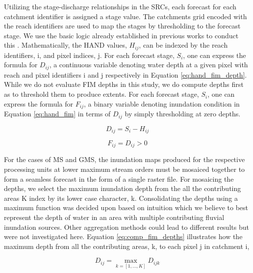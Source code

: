 \documentclass[draft]{dependencies/agujournal2019}
\begin{document}
Utilizing the stage-discharge relationships in the SRCs, each forecast for each catchment identifier is assigned a stage value. 
The catchments grid encoded with the reach identifiers are used to map the stages by thresholding to the forecast stage.
We use the basic logic already established in previous works to conduct this \cite{nobre2016hand,liu2016cybergis,maidment2017conceptual}.
Mathematically, the HAND values, $H_{ij}$, can be indexed by the reach identifiers, i, and pixel indices, j.
For each forecast stage, $S_i$, one can express the formula for $D_{ij}$, a continuous variable denoting water depth at a given pixel with reach and pixel identifiers i and j respectively in Equation \ref{eq:hand_fim_depth}.
While we do not evaluate FIM depths in this study, we do compute depths first as to threshold them to produce extents.
For each forecast stage, $S_i$, one can express the formula for $F_{ij}$, a binary variable denoting inundation condition in Equation \ref{eq:hand_fim} in terms of $D_{ij}$ by simply thresholding at zero depths.
%
\begin{linenomath*}
\begin{equation}
\label{eq:hand_fim_depth}
    D_{ij} = S_i - H_{ij}
\end{equation}
\end{linenomath*}
%
\begin{linenomath*}
\begin{equation}
\label{eq:hand_fim}
    F_{ij} = D_{ij} > 0
\end{equation}
\end{linenomath*}
%
For the cases of MS and GMS, the inundation maps produced for the respective processing units at lower maximum stream orders must be mosaiced together to form a seamless forecast in the form of a single raster file.
For mosaicing the depths, we select the maximum inundation depth from the all the contributing areas K index by its lower case character, k.
Consolidating the depths using a maximum function was decided upon based on intuition which we believe to best represent the depth of water in an area with multiple contributing fluvial inundation sources.
Other aggregation methods could lead to different results but were not investigated here.
Equation \ref{eq:comp_fim_depths} illustrates how the maximum depth from all the contributing areas, k, to each pixel j in catchment i,
%
\begin{linenomath*}
\begin{equation}
\label{eq:comp_fim_depths}
    D_{ij} = \max_{k=[1,...,K]} D_{ijk}
\end{equation}
\end{linenomath*}
\end{document}
